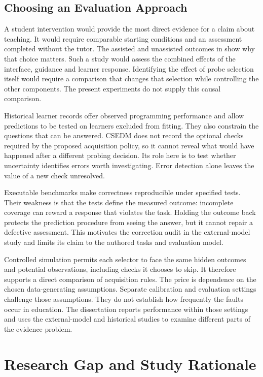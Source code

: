 \subsection{Choosing an Evaluation Approach}

A student intervention would provide the most direct evidence for a claim about teaching. It would require comparable
starting conditions and an assessment completed without the tutor. The assisted and unassisted outcomes in
\textcite{bastani2025guardrails} show why that choice matters. Such a study would assess the combined effects of the interface,
guidance and learner response. Identifying the effect of probe selection itself would require a comparison that changes that
selection while controlling the other components. The present experiments do not supply this causal comparison.

Historical learner records offer observed programming performance and allow predictions to be tested on learners excluded
from fitting. They also constrain the questions that can be answered. CSEDM does not record the optional checks required by
the proposed acquisition policy, so it cannot reveal what would have happened after a different probing decision. Its role
here is to test whether uncertainty identifies errors worth investigating. Error detection alone leaves the value of a new
check unresolved.

Executable benchmarks make correctness reproducible under specified tests. Their weakness is that the tests define the
measured outcome: incomplete coverage can reward a response that violates the task. Holding the outcome back protects the
prediction procedure from seeing the answer, but it cannot repair a defective assessment. This motivates the correction
audit in the external-model study and limits its claim to the authored tasks and evaluation model.

Controlled simulation permits each selector to face the same hidden outcomes and potential observations, including checks
it chooses to skip. It therefore supports a direct comparison of acquisition rules. The price is dependence on the chosen
data-generating assumptions. Separate calibration and evaluation settings challenge those assumptions. They do not establish
how frequently the faults occur in education. The dissertation reports performance within those settings and uses the
external-model and historical studies to examine different parts of the evidence problem.

\section{Research Gap and Study Rationale}


